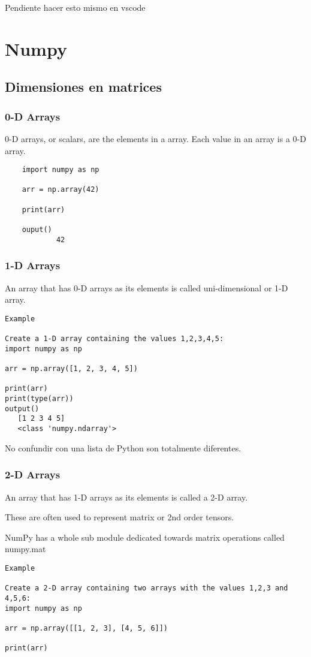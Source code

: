 Pendiente hacer esto mismo en vscode

\chapter{Numpy}

\section{Dimensiones en matrices}

\subsection{0-D Arrays}
0-D arrays, or scalars, are the elements in a array. Each value in an array is a 0-D array.

\begin{verbatim}
	import numpy as np
	
	arr = np.array(42)
	
	print(arr) 
	
	ouput()
			42
\end{verbatim}


\subsection{1-D Arrays}
An array that has 0-D arrays as its elements is called uni-dimensional or 1-D array.

\begin{verbatim}
Example

Create a 1-D array containing the values 1,2,3,4,5:
import numpy as np

arr = np.array([1, 2, 3, 4, 5])

print(arr) 
print(type(arr)) 
output()
   [1 2 3 4 5]
   <class 'numpy.ndarray'>
\end{verbatim}
No confundir con una lista de Python son totalmente diferentes.


\subsection{2-D Arrays}
An array that has 1-D arrays as its elements is called a 2-D array.

These are often used to represent matrix or 2nd order tensors.

NumPy has a whole sub module dedicated towards matrix operations called numpy.mat

\begin{verbatim}
Example

Create a 2-D array containing two arrays with the values 1,2,3 and 4,5,6:
import numpy as np

arr = np.array([[1, 2, 3], [4, 5, 6]])

print(arr) 
\end{verbatim}





